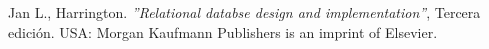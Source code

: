 \begin{thebibliography}{9}
        Jan L., Harrington. \textit{''Relational databse design and implementation''}, Tercera edición. USA: Morgan Kaufmann Publishers is an imprint of Elsevier. 
   
\begin{comment}
    
     
    \bibitem{objetivo2}
        B. Marín, J. Frez, J. Cruz-Lemus, and M. Genero. 2018.
        \textit{An Empirical Investigation on the Benefits of Gamification in Programming Courses.} ACM Trans. Comput. Educ. 19, 1, Article 4 (November 2018), 22 pages.
    
    \bibitem{arte12}
        M. García-Iruela and R. Hijón-Neira, 
        \textit{"Proposal of a management interface for gamified environments in Moodle,"} 2018 International Symposium on Computers in Education (SIIE), Jerez, 2018, p. 2.
        
    \bibitem{octa1}
        Matos, P. F. (2018). 
        \textit{Gamification–The power of motivation using Octalysis Framework} (Bachelor's thesis).
        
    \bibitem{Octalysis}
        Y. Chou, 
        \textit{Actionable Gamification.}
        Malpitas, CA, USA: Octalysis Media, 2016.
        
    \bibitem{octa2}
        Dicheva, D., Dichev, C., Agre, G., \& Angelova, G. (2015). 
        \textit{Gamification in Education: A Systematic Mapping Study.} 
        Educational Technology \& Society, 18 (3).
    
    \bibitem{octa3}
        Sanchez-Gordón, M. L., Colomo-Palacios, R., \& Herranz, E. (2016, September). 
        \textit{Gamification and human factors in quality management systems: mapping from octalysis framework to ISO 10018.} 
        In European Conference on Software Process Improvement (pp. 234-241). Springer, Cham.
    
    \bibitem{octa4}
        Ewais, S., \& Alluhaidan, A. (2015). 
        \textit{Classification of stress management mHealth apps based on octalysis framework.}
        
    \bibitem{octa5}
        Cabrera, W. R. R., \& Pech, S. H. Q. 
        \textit{Aprendizaje en un Ambiente Virtual a Través de la Gamificación: Una experiencia en una Universidad en México.}
        Tecnologías y Aprendizaje, 508.
        
    
    
    
    
    
\end{comment}   
\end{thebibliography}
